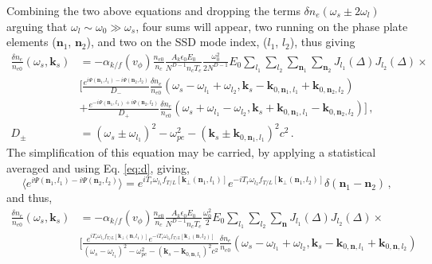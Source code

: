 \documentclass[
 reprint,
 amsmath,amssymb,
 aps,
]{revtex4-1}
\begin{document}
\begin{widetext}
Combining the two above equations and dropping the terms $\delta n_e(\omega_s \pm 2 \omega_l) $ arguing that  $\omega_l\sim \omega_0 \gg \omega _s$, four sums will appear, two running on the phase plate elements ($\mathbf{n}_1$, $\mathbf{n}_2$), and two on the SSD mode index, ($l_1$, $l_2$), thus giving
\begin{align}
   \frac{\delta n_e }{n_{e0}}(\omega_s,\mathbf{k}_s) &= -\alpha_{k/f}(v_\phi)\frac{n_{e0}}{n_c} \frac{A_k\epsilon_0 E_0}{N^{D-1} n_c T_e}\frac{\omega_0^2}{2N^{D-1}} E_0 \sum_{l_1} \sum_{l_2} \sum_{\mathbf{n}_1}    \sum_{\mathbf{n}_2}    J_{l_1}(\Delta)J_{l_2}(\Delta)\times  \nonumber \\
  & \Big[  
     \frac{e^{i \Psi(\mathbf{n}_1,l_1)-i \Psi(\mathbf{n}_2,l_2)}}{D_-}\frac{\delta n_e }{n_{e0}}  (\omega_s-\omega_{l_1}+\omega_{l_2},\mathbf{k}_s-\mathbf{k}_{0,\mathbf{n}_1,l_1}+\mathbf{k}_{0,\mathbf{n}_2,l_2})\nonumber\\
   & + \frac{e^{-i \Psi(\mathbf{n}_1,l_1)+i \Psi(\mathbf{n}_2,l_2)  }}{D_+} \frac{\delta n_e }{n_{e0}}(\omega_s+\omega_{l_1}-\omega_{l_2},\mathbf{k}_s+\mathbf{k}_{0,\mathbf{n}_1,l_1}-\mathbf{k}_{0,\mathbf{n}_2,l_2})
   \Big]
   \, ,\label{eq:fssd2} \\
   D_\pm &= (\omega_s\pm\omega_{l_1})^2 - \omega_{pe}^2 -(\mathbf{k}_s\pm\mathbf{k}_{0,\mathbf{n}_1,l_1})^2c^2 \, .
\end{align}
The simplification of this equation may be carried, by applying a statistical averaged and using Eq. \eqref{eq:d}, giving, 
 \begin{equation}\label{eq:d2}
 \langle e^{i \Psi(\mathbf{n}_1,l_1)-i \Psi(\mathbf{n}_2,l_2) }\rangle=
  e^{iT_{r} \omega_{l_1}f_{T/L}[\mathbf{k}_\perp(\mathbf{n}_1,l_1)]  }
  e^{-iT_{r}  \omega_{l_2}f_{T/L}[\mathbf{k}_\perp(\mathbf{n}_1,l_2)]  }
 \delta(\mathbf{n}_1-\mathbf{n}_2) \, ,
 \end{equation}
and thus,
\begin{align}
   \frac{\delta n_e }{n_{e0}}(\omega_s,\mathbf{k}_s) &= -\alpha_{k/f}(v_\phi) \frac{n_{e0}}{n_c} \frac{A_k\epsilon_0 E_0}{N^{D-1} n_c T_e}\frac{\omega_0^2}{2} E_0  \sum_{l_1}  \sum_{l_2} \sum_{\mathbf{n}}    J_{l_1}(\Delta)J_{l_2}(\Delta) \times \nonumber \\
  & \Big[  
     \frac{  e^{iT_{r} \omega_{l_1}f_{T/L}[\mathbf{k}_\perp(\mathbf{n},l_1)]  }
  e^{-iT_{r}  \omega_{l_2}f_{T/L}[\mathbf{k}_\perp(\mathbf{n},l_2)]  }
     }{(\omega_s-\omega_{l_1})^2 - \omega_{pe}^2 -(\mathbf{k}_s- \mathbf{k}_{0,\mathbf{n},l_1})^2c^2}
     \frac{\delta n_e }{n_{e0}}  (\omega_s-\omega_{l_1}+\omega_{l_2},\mathbf{k}_s-\mathbf{k}_{0,\mathbf{n},l_1}+\mathbf{k}_{0,\mathbf{n},l_2})\nonumber\\&

\end{align}
\end{widetext}
\end{document}
